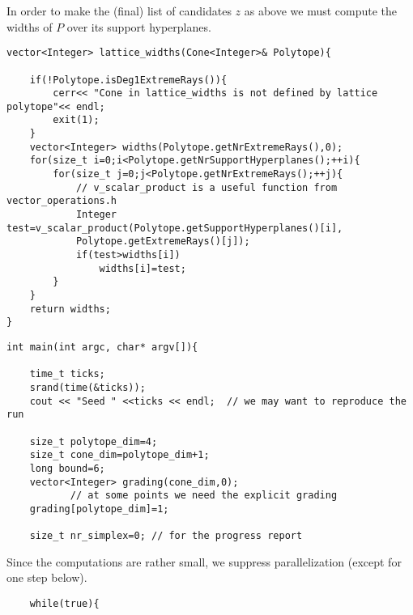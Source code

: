 \documentclass[12pt,a4paper]{scrartcl}
\theoremstyle{definition}
\begin{document}
\begin{small}
In order to make the (final) list of candidates $z$ as above we must compute the widths of $P$ over its support hyperplanes.
\begin{Verbatim}
vector<Integer> lattice_widths(Cone<Integer>& Polytope){

    if(!Polytope.isDeg1ExtremeRays()){
        cerr<< "Cone in lattice_widths is not defined by lattice polytope"<< endl;
        exit(1);
    }
    vector<Integer> widths(Polytope.getNrExtremeRays(),0);
    for(size_t i=0;i<Polytope.getNrSupportHyperplanes();++i){
        for(size_t j=0;j<Polytope.getNrExtremeRays();++j){
            // v_scalar_product is a useful function from vector_operations.h
            Integer test=v_scalar_product(Polytope.getSupportHyperplanes()[i],
            Polytope.getExtremeRays()[j]);
            if(test>widths[i])
                widths[i]=test;
        }
    }
    return widths;
}
\end{Verbatim}

\begin{Verbatim}
int main(int argc, char* argv[]){

    time_t ticks;
    srand(time(&ticks));
    cout << "Seed " <<ticks << endl;  // we may want to reproduce the run

    size_t polytope_dim=4;
    size_t cone_dim=polytope_dim+1;
    long bound=6;
    vector<Integer> grading(cone_dim,0); 
           // at some points we need the explicit grading
    grading[polytope_dim]=1;

    size_t nr_simplex=0; // for the progress report
\end{Verbatim}
Since the computations are rather small, we suppress parallelization (except for one step below).
\begin{Verbatim}
    while(true){


\end{Verbatim}
\end{small}
\end{document}

